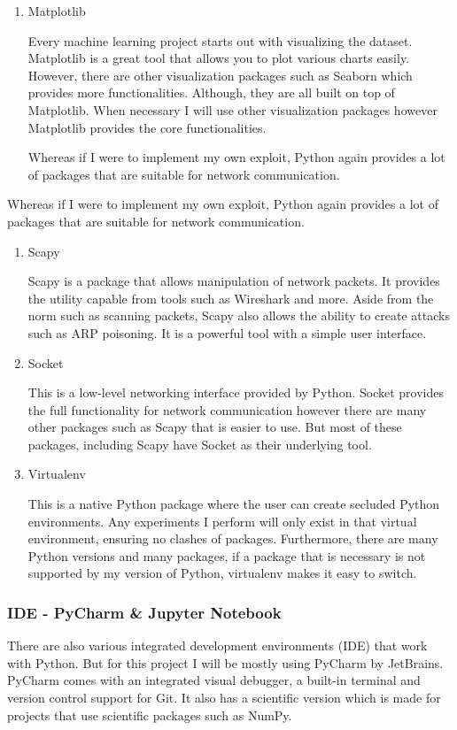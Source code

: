 \documentclass[11pt]{article}
\begin{document}
\begin{enumerate}
  \item{Matplotlib}

  Every machine learning project starts out with visualizing the dataset. Matplotlib is a great tool that allows you to plot various charts easily. However, there are other visualization packages such as Seaborn which provides more functionalities. Although, they are all built on top of Matplotlib. When necessary I will use other visualization packages however Matplotlib provides the core functionalities.

  Whereas if I were to implement my own exploit, Python again provides a lot of packages that are suitable for network communication. 
\end{enumerate}

Whereas if I were to implement my own exploit, Python again provides a lot of packages that are suitable for network communication. 

\begin{enumerate}
  \item{Scapy}

  Scapy is a package that allows manipulation of network packets. It provides the utility capable from tools such as Wireshark \cite{bg-work-pentesting-lib} and more. Aside from the norm such as scanning packets, Scapy also allows the ability to create attacks such as ARP poisoning. It is a powerful tool with a simple user interface.

  \item{Socket}
  
  This is a low-level networking interface provided by Python. Socket provides the full functionality for network communication however there are many other packages such as Scapy that is easier to use. But most of these packages, including Scapy have Socket as their underlying tool.

  \item{Virtualenv}

  This is a native Python package where the user can create secluded Python environments. Any experiments I perform will only exist in that virtual environment, ensuring no clashes of packages. Furthermore, there are many Python versions and many packages, if a package that is necessary is not supported by my version of Python, virtualenv makes it easy to switch.  
\end{enumerate}

\subsubsection{IDE - PyCharm \& Jupyter Notebook}
There are also various integrated development environments (IDE) that work with Python. But for this project I will be mostly using PyCharm by JetBrains. PyCharm comes with an integrated visual debugger, a built-in terminal and version control support for Git. It also has a scientific version which is made for projects that use scientific packages such as NumPy.
\end{document}
